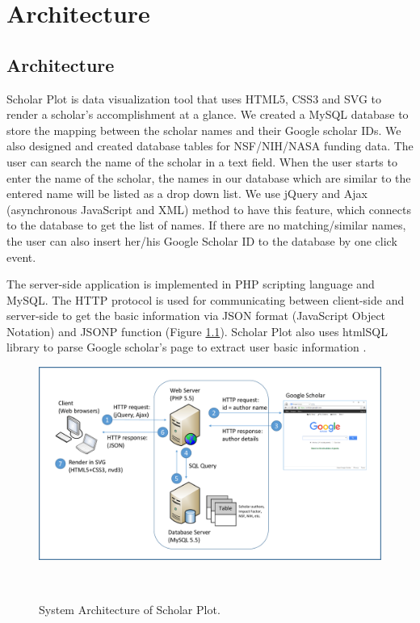 \chapter{Architecture}\label{chap:Algorithms}
\section{Architecture}
Scholar Plot is data visualization tool that uses HTML5, CSS3 and SVG to render a scholar's accomplishment at a glance. We created a MySQL database to store the mapping between the scholar names and their Google scholar IDs. We also designed and created database tables for NSF/NIH/NASA funding data. The user can search the name of the scholar in a text field. When the user starts to enter the name of the scholar, the names in our database which are similar to the entered name will be listed as a drop down list. We use jQuery and Ajax (asynchronous JavaScript and XML) method to have this feature, which connects to the database to get the list of names. If there are no matching/similar names, the user can also insert her/his Google Scholar ID to the database by one click event.

The server-side application is implemented in PHP scripting language and MySQL. The HTTP protocol is used for communicating between client-side and server-side to get the basic information via JSON format (JavaScript Object Notation) and JSONP function (Figure \ref{fig:fig-arch}). Scholar Plot also uses htmlSQL library to parse Google scholar's page to extract user basic information \cite{htmlSQL}.

\begin{figure}
\centering
  \includegraphics[width=1\columnwidth]{figures/fig_system_architecture.pdf}
  \caption{System Architecture of Scholar Plot.}~\label{fig:fig-arch}
\end{figure}

